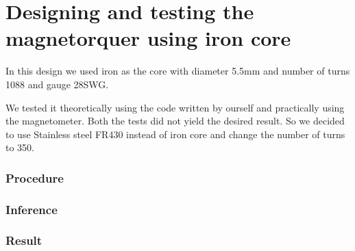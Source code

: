 \chapter{Designing and testing the magnetorquer using iron core}

\vspace{15pt}

In this design we used iron as the core with diameter 5.5mm and number of turns 1088 and gauge 28SWG. 

We tested it theoretically using the code written by ourself and practically using the magnetometer. Both the tests did not yield the desired result. So we decided to use Stainless steel FR430 instead of iron core and change the number of turns to 350.


\subsection{Procedure}

\subsection{Inference}

\subsection{Result}
